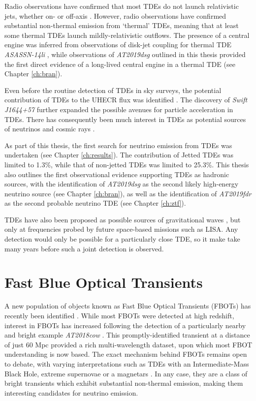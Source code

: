 Radio observations have confirmed that most TDEs do not launch relativistic jets, whether on- or off-axis . However, radio observations have confirmed substantial non-thermal emission from `thermal' TDEs, meaning that at least some thermal TDEs launch mildly-relativistic outflows. The presence of a central engine was inferred from observations of disk-jet coupling for thermal TDE \emph{ASASSN-14li} , while observations of \emph{AT2019dsg} outlined in this thesis provided the first direct evidence of a long-lived central engine in a thermal TDE (see Chapter \ref{ch:bran}).

Even before the routine detection of TDEs in sky surveys, the potential contribution of TDEs to the UHECR flux was identified . The discovery of \emph{Swift J1644+57} further expanded the possible avenues for particle acceleration in TDEs. There has consequently been much interest in TDEs as potential sources of neutrinos and cosmic rays . 

As part of this thesis, the first search for neutrino emission from TDEs was undertaken (see Chapter \ref{ch:results}). The contribution of Jetted TDEs was limited to 1.3\%, while that of non-jetted TDEs was limited to 25.3\%.  This thesis also outlines the first observational evidence supporting TDEs as hadronic sources, with the identification of \emph{AT2019dsg} as the second likely high-energy neutrino source (see Chapter \ref{ch:bran}), as well as the identification of \emph{AT2019fdr} as the second probable neutrino TDE (see Chapter \ref{ch:ztf}).

TDEs have also been proposed as possible sources of gravitational waves , but only at frequencies probed by future space-based missions such as LISA. Any detection would only be possible for a particularly close TDE, so it make take many years before such a joint detection is observed.

\section{Fast Blue Optical Transients}
\label{sec:fbot}

A new population of objects known as Fast Blue Optical Transients (FBOTs) has recently been identified . While most FBOTs were detected at high redshift, interest in FBOTs has increased following the detection of a particularly nearby and bright example \emph{AT2018cow} . This promptly-identified transient at a distance of just 60 Mpc provided a rich multi-wavelength dataset, upon which most FBOT understanding is now based. The exact mechanism behind FBOTs remains open to debate, with varying interpretations such as TDEs with an Intermediate-Mass Black Hole, extreme supernovae or a magnetars . In any case, they are a class of bright transients which exhibit substantial non-thermal emission, making them interesting candidates for neutrino emission.

